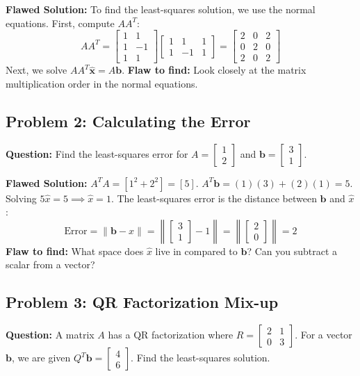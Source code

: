 \documentclass[11pt, letterpaper]{article}
\theoremstyle{definition}
\theoremstyle{remark}
\begin{document}
\textbf{Flawed Solution:}
To find the least-squares solution, we use the normal equations. First, compute $A A^T$:
\[ A A^T = \begin{bmatrix} 1 & 1 \\ 1 & -1 \\ 1 & 1 \end{bmatrix} \begin{bmatrix} 1 & 1 & 1 \\ 1 & -1 & 1 \end{bmatrix} = \begin{bmatrix} 2 & 0 & 2 \\ 0 & 2 & 0 \\ 2 & 0 & 2 \end{bmatrix} \]
Next, we solve $A A^T \hat{\mathbf{x}} = A \mathbf{b}$.
\textbf{Flaw to find:} Look closely at the matrix multiplication order in the normal equations.

\subsection{Problem 2: Calculating the Error}
\textbf{Question:} Find the least-squares error for $A = \begin{bmatrix} 1 \\ 2 \end{bmatrix}$ and $\mathbf{b} = \begin{bmatrix} 3 \\ 1 \end{bmatrix}$.

\textbf{Flawed Solution:}
$A^T A = [1^2 + 2^2] = [5]$.
$A^T \mathbf{b} = (1)(3) + (2)(1) = 5$.
Solving $5\hat{x} = 5 \implies \hat{x} = 1$.
The least-squares error is the distance between $\mathbf{b}$ and $\hat{x}$:
\[ \text{Error} = \|\mathbf{b} - \hat{x}\| = \left\| \begin{bmatrix} 3 \\ 1 \end{bmatrix} - 1 \right\| = \left\| \begin{bmatrix} 2 \\ 0 \end{bmatrix} \right\| = 2 \]
\textbf{Flaw to find:} What space does $\hat{x}$ live in compared to $\mathbf{b}$? Can you subtract a scalar from a vector?

\subsection{Problem 3: QR Factorization Mix-up}
\textbf{Question:} A matrix $A$ has a QR factorization where $R = \begin{bmatrix} 2 & 1 \\ 0 & 3 \end{bmatrix}$. For a vector $\mathbf{b}$, we are given $Q^T \mathbf{b} = \begin{bmatrix} 4 \\ 6 \end{bmatrix}$. Find the least-squares solution.
\end{document}
